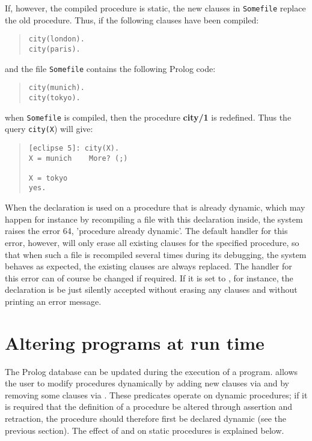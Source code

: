 If, however, the compiled procedure is static,
the new clauses in {\tt Somefile} replace the old procedure.
Thus, if
the following clauses have been compiled:
\begin{quote}
\begin{verbatim}
city(london).
city(paris).
\end{verbatim}
\end{quote}
and the file {\tt Somefile} contains the following Prolog code:
\begin{quote}
\begin{verbatim}
city(munich).
city(tokyo).
\end{verbatim}
\end{quote}
when {\tt Somefile} is compiled, then the procedure {\bf city/1} is redefined.
Thus the query {\tt city(X}) will give:
\begin{quote}
\begin{verbatim}
[eclipse 5]: city(X).
X = munich    More? (;)

X = tokyo
yes.
\end{verbatim}
\end{quote}

When the  declaration is used on a procedure that is
already dynamic, which may happen for instance by recompiling a file
with this declaration inside, the system raises the error 64,
'procedure already dynamic'.
The default handler for this error, however, will only erase
all existing clauses for the specified procedure, so that
when such a file is recompiled several times during its debugging,
the system behaves as expected, the existing clauses
are always replaced.
The handler for this error can of course be changed if required.
If it is set to , for instance,
the  declaration is be just silently
accepted without erasing any clauses and without printing an error message.

\section{Altering programs at run time}

The Prolog database can be updated during the execution of a program.
{\eclipse} allows the user to modify procedures dynamically by adding
new clauses via  and by removing some clauses via .
These predicates operate on dynamic procedures; if it is
required that the definition of a procedure be altered through
assertion and retraction, the procedure should therefore first be declared
dynamic (see the previous section). The effect of  and
 on static procedures is explained below.


